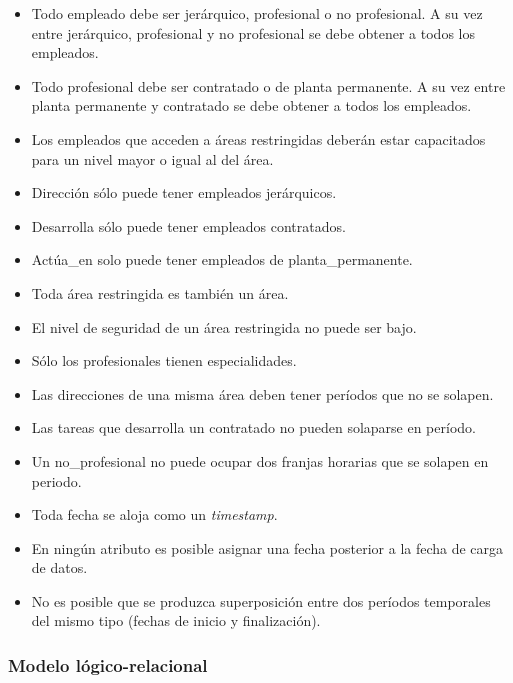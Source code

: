 \begin{itemize}
    \item Todo empleado debe ser jerárquico, profesional o no profesional. A su vez entre
          jerárquico, profesional y no profesional se debe obtener a todos los empleados.
    \item Todo profesional debe ser contratado o de planta permanente. A su vez entre
          planta permanente y contratado se debe obtener a todos los empleados.
    \item Los empleados que acceden a áreas restringidas deberán estar capacitados para
          un nivel mayor o igual al del área.
    \item Dirección sólo puede tener empleados jerárquicos.
    \item Desarrolla sólo puede tener empleados contratados.
    \item Actúa\_en solo puede tener empleados de planta\_permanente.
    \item Toda área restringida es también un área.
    \item El nivel de seguridad de un área restringida no puede ser bajo.
    \item Sólo los profesionales tienen especialidades.
    \item Las direcciones de una misma área deben tener períodos que no se solapen.
    \item Las tareas que desarrolla un contratado no pueden solaparse en período.
    \item Un no\_profesional no puede ocupar dos franjas horarias que se solapen en
          periodo.
    \item Toda fecha se aloja como un \textit{timestamp}.
    \item En ningún atributo es posible asignar una fecha posterior a la fecha de carga
          de datos.
    \item No es posible que se produzca superposición entre dos períodos temporales del
          mismo tipo (fechas de inicio y finalización).
\end{itemize}

\subsubsection{Modelo lógico-relacional}

\newcommand{\pk}[1]{\underline{#1}}
\newcommand{\fk}[1]{\dashuline{#1}}
\newcommand{\ent}[1]{\uppercase{\texttt{#1}}}
\newcommand{\att}[1]{\texttt{\makefirstuc{#1}}}
\newcommand{\CK}[1]{CK=\{(#1)\}}
\newcommand{\FK}[1]{FK=\{(#1)\}}
\newcommand{\PK}[1]{PK=\{(#1)\}}
\newcommand{\fmin}[2]{$F_{\text{mín}}$: \{#1\} $\rightarrow$ \{#2\}}

